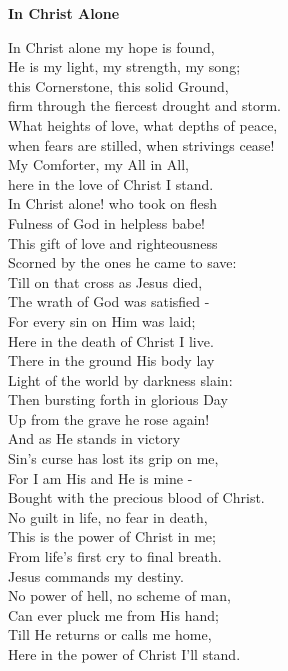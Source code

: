 \textbf{In Christ Alone}

In Christ alone my hope is found, \\
He is my light, my strength, my song; \\
this Cornerstone, this solid Ground, \\
firm through the fiercest drought and storm. \\
What heights of love, what depths of peace, \\
when fears are stilled, when strivings cease! \\
My Comforter, my All in All, \\
here in the love of Christ I stand. \\

In Christ alone! who took on flesh \\
Fulness of God in helpless babe! \\
This gift of love and righteousness \\
Scorned by the ones he came to save: \\
Till on that cross as Jesus died, \\
The wrath of God was satisfied - \\
For every sin on Him was laid; \\
Here in the death of Christ I live. \\

There in the ground His body lay \\
Light of the world by darkness slain: \\
Then bursting forth in glorious Day \\
Up from the grave he rose again! \\
And as He stands in victory \\
Sin's curse has lost its grip on me, \\
For I am His and He is mine - \\
Bought with the precious blood of Christ. \\

No guilt in life, no fear in death, \\
This is the power of Christ in me; \\
From life's first cry to final breath. \\
Jesus commands my destiny. \\
No power of hell, no scheme of man, \\
Can ever pluck me from His hand; \\
Till He returns or calls me home, \\
Here in the power of Christ I'll stand. \\
